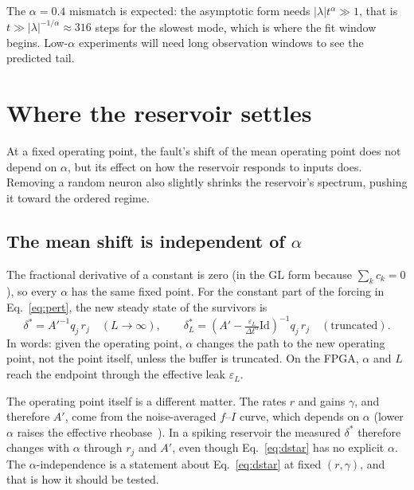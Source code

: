 \documentclass[11pt,a4paper]{article}
\begin{document}
The $\alpha = 0.4$ mismatch is expected: the asymptotic form needs $|\lambda| t^{\alpha} \gg 1$, that is $t \gg |\lambda|^{-1/\alpha} \approx 316$ steps for the slowest mode, which is where the fit window begins. Low-$\alpha$ experiments will need long observation windows to see the predicted tail.

\section{Where the reservoir settles}
\label{sec:settle}

At a fixed operating point, the fault's shift of the mean operating point does not depend on $\alpha$, but its effect on how the reservoir responds to inputs does. Removing a random neuron also slightly shrinks the reservoir's spectrum, pushing it toward the ordered regime.

\subsection{The mean shift is independent of \texorpdfstring{$\alpha$}{alpha}}

The fractional derivative of a constant is zero (in the GL form because $\sum_k c_k = 0$), so every $\alpha$ has the same fixed point. For the constant part of the forcing in Eq.~\eqref{eq:pert}, the new steady state of the survivors is
\begin{equation}
\delta^{*} = A'^{-1} q_j\, r_j \quad (L \to \infty), \qquad \delta^{*}_L = \left(A' - \tfrac{\varepsilon_L}{\Delta t^{\alpha}} \mathrm{Id}\right)^{-1} q_j\, r_j \quad (\text{truncated}).
\label{eq:dstar}
\end{equation}
In words: given the operating point, $\alpha$ changes the path to the new operating point, not the point itself, unless the buffer is truncated. On the FPGA, $\alpha$ and $L$ reach the endpoint through the effective leak $\varepsilon_L$.

The operating point itself is a different matter. The rates $r$ and gains $\gamma$, and therefore $A'$, come from the noise-averaged $f$--$I$ curve, which depends on $\alpha$ (lower $\alpha$ raises the effective rheobase~\cite{mastin2026}). In a spiking reservoir the measured $\delta^{*}$ therefore changes with $\alpha$ through $r_j$ and $A'$, even though Eq.~\eqref{eq:dstar} has no explicit $\alpha$. The $\alpha$-independence is a statement about Eq.~\eqref{eq:dstar} at fixed $(r, \gamma)$, and that is how it should be tested.
\end{document}
